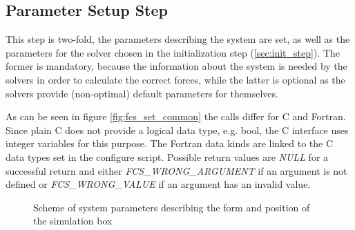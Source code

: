 \subsection{Parameter Setup Step}
\label{sec:par_setup}
This step is two-fold, the parameters describing the system are set, as well as the parameters for the solver
chosen in the initialization step (\ref{sec:init_step}). The former is mandatory, because the information about
the system is needed by the solvers in order to calculate the correct forces, while the latter is optional as
the solvers provide (non-optimal) default parameters for themselves.

As can be seen in figure \ref{fig:fcs_set_common} the calls differ for C and Fortran. Since plain C does not provide a logical data type, e.g. bool,
the C interface uses integer variables for this purpose. The Fortran data kinds are linked to the C data types set in the configure script. Possible
return values are \textit{NULL} for a successful return and either \newline\textit{FCS\_WRONG\_ARGUMENT} if an argument is not defined or \textit{FCS\_WRONG\_VALUE}
if an argument has an invalid value.\\

\begin{figure}[htb]
\begin{center}
\end{center}
\caption{Scheme of system parameters describing the form and position of the simulation box}
\label{fig:interface_box_scheme}
\end{figure}

